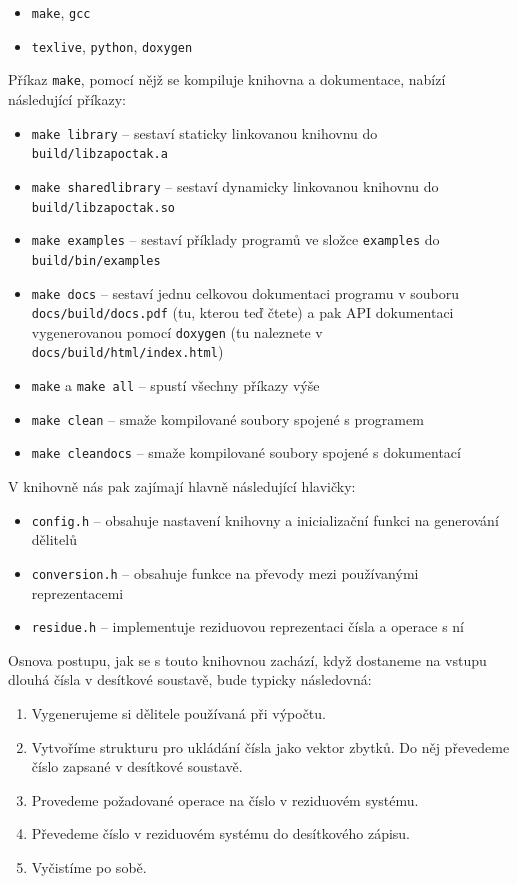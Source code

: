 \documentclass[titlepage]{article}
\begin{document}
\begin{itemize}
  \item \verb|make|, \verb|gcc|
  \item \verb|texlive|, \verb|python|, \verb|doxygen|
\end{itemize}

Příkaz \verb|make|, pomocí nějž se kompiluje knihovna a dokumentace, nabízí
následující příkazy:

\begin{itemize}
  \item \verb|make library| -- sestaví staticky linkovanou knihovnu do
    \verb|build/libzapoctak.a|
  \item \verb|make sharedlibrary| -- sestaví dynamicky linkovanou knihovnu do
    \verb|build/libzapoctak.so|
  \item \verb|make examples| -- sestaví příklady programů ve složce
    \verb|examples| do \verb|build/bin/examples|
  \item \verb|make docs| -- sestaví jednu celkovou dokumentaci programu v
    souboru \verb|docs/build/docs.pdf| (tu, kterou teď čtete) a pak API
    dokumentaci vygenerovanou pomocí \verb|doxygen| (tu naleznete v
    \verb|docs/build/html/index.html|)
  \item \verb|make| a \verb|make all| -- spustí všechny příkazy výše
  \item \verb|make clean| -- smaže kompilované soubory spojené s programem
  \item \verb|make cleandocs| -- smaže kompilované soubory spojené s dokumentací
\end{itemize}

V knihovně nás pak zajímají hlavně následující hlavičky:

\begin{itemize}
  \item \verb|config.h| -- obsahuje nastavení knihovny a inicializační funkci
    na generování dělitelů
  \item \verb|conversion.h| -- obsahuje funkce na převody mezi používanými reprezentacemi
  \item \verb|residue.h| -- implementuje reziduovou reprezentaci čísla a operace s ní
\end{itemize}

Osnova postupu, jak se s touto knihovnou zachází, když dostaneme na vstupu
dlouhá čísla v desítkové soustavě, bude typicky následovná:

\begin{enumerate}
  \item Vygenerujeme si dělitele používaná při výpočtu.
  \item Vytvoříme strukturu pro ukládání čísla jako vektor zbytků. Do něj
    převedeme číslo zapsané v desítkové soustavě.
  \item Provedeme požadované operace na číslo v reziduovém systému.
  \item Převedeme číslo v reziduovém systému do desítkového zápisu.
  \item Vyčistíme po sobě.
\end{enumerate}
\end{document}
